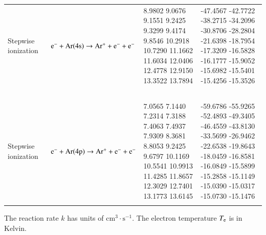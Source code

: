 \documentclass{warpdoc}
\newcommand{\alb}{\vspace{0.2cm}\\} %
\begin{document}
\begin{table}[!ht]
\begin{threeparttable}
\begin{tabular*}{\textwidth}{@{}l@{\extracolsep{\fill}}lll@{}}
Stepwise ionization & ~{$\rm e^- + Ar(4s) \rightarrow Ar^+ + e^- + e^-$  } &   \begin{minipage}[t]{0.28\textwidth}\raggedright  
      8.9802
      9.0676
      9.1551
      9.2425
      9.3299
      9.4174
      9.8546
      10.2918
      10.7290
      11.1662
      11.6034
      12.0406
      12.4778
      12.9150
      13.3522
      13.7894
 \end{minipage}  & \begin{minipage}[t]{0.28\textwidth}\raggedright 
      -47.4567
      -42.7722
      -38.2715
      -34.2096
      -30.8706
      -28.2804
      -21.6398
      -18.7954
      -17.3209
      -16.5828
      -16.1777
      -15.9052
      -15.6982
      -15.5401
      -15.4256
      -15.3526
\end{minipage} \\ 
~\\

Stepwise ionization & ~{$\rm e^- + Ar(4p) \rightarrow Ar^+ + e^- + e^-$  } &   \begin{minipage}[t]{0.28\textwidth}\raggedright  
      7.0565
      7.1440
      7.2314
      7.3188
      7.4063
      7.4937
      7.9309
      8.3681
      8.8053
      9.2425
      9.6797
      10.1169
      10.5541
      10.9913
      11.4285
      11.8657
      12.3029
      12.7401
      13.1773
      13.6145
 \end{minipage}  & \begin{minipage}[t]{0.28\textwidth}\raggedright 
      -59.6786
      -55.9265
      -52.4893
      -49.3405
      -46.4559
      -43.8130
      -33.5699
      -26.9462
      -22.6538
      -19.8643
      -18.0459
      -16.8581
      -16.0849
      -15.5899
      -15.2858
      -15.1149
      -15.0390
      -15.0317
      -15.0730
      -15.1476
\end{minipage} \\ 
 \alb 
    \bottomrule
    \end{tabular*}
\begin{tablenotes}
\item[{a}] The reaction rate $k$ has units of $\textrm{cm}^3\cdot \textrm{s}^{-1}$. The electron temperature $T_{\rm e}$ is in Kelvin.

\end{tablenotes}
\label{tab:reactionratessplinecontrolpoints}
   \end{threeparttable}
\end{table}




 \clearpage


\end{document}
